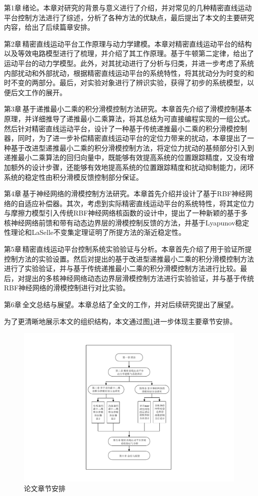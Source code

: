 第1章$\,$绪论。本章对研究的背景与意义进行了介绍，并对常见的几种精密直线运动平台控制方法进行了综述，分析了各种方法的优缺点，最后提出了本文的主要研究内容，给出了后续篇章安排。

第2章$\,$精密直线运动平台工作原理与动力学建模。本章对精密直线运动平台的结构以及等效电路模型进行了梳理，并介绍了其工作原理。基于牛顿第二定律，给出了运动平台的动力学模型。此外，对其扰动进行了分析与归类，并进一步考虑了系统内部扰动和外部扰动，根据精密直线运动平台的系统特性，将其扰动分为时变的和时不变的两部分。最后，对实验对象进行了辨识实验，获得了初步的系统模型，以便后文工作的展开。

第3章$\,$基于递推最小二乘的积分滑模控制方法研究。本章首先介绍了滑模控制基本原理，并详细推导了递推最小二乘算法，将其总结为可直接编程实现的一组公式。然后针对精密直线运动平台，设计了一种基于传统递推最小二乘的积分滑模控制器，同时，为了进一步补偿精密直线运动平台的定位力带来的扰动，本章提出了一种基于改进型递推最小二乘的积分滑模控制方法，将定位力扰动的基频部分引入到递推最小二乘算法的回归向量中，既能够有效提高系统的位置跟踪精度，又没有增加额外的设计步骤，还能够有效地提高系统的位置跟踪精度和扰动抑制能力，闭环系统的稳定性由积分滑模反馈控制部分保证。

第4章$\,$基于神经网络的滑模控制方法研究。本章首先介绍并设计了基于RBF神经网络的自适应补偿器。其次，考虑到实际精密直线运动平台的系统特性，将其定位力与摩擦力模型引入传统RBF神经网络核函数的设计中，提出了一种新颖的基于多核神经网络前馈和带有动态边界层的滑模控制反馈的方法，并基于Lyapunov稳定性理论和LaSelle不变集定理证明了所提方法的渐近稳定性。

第5章$\,$精密直线运动平台控制系统实验验证与分析。本章首先介绍了用于验证所提控制方法的实验设置。然后对提出的基于改进型递推最小二乘的积分滑模控制方法进行了实验验证，并与基于传统递推最小二乘的积分滑模控制方法进行比较。最后，对提出的多核神经网络动态边界层滑模控制方法进行实验验证，并与基于传统RBF神经网络的滑模控制进行对比实验。

第6章$\,$全文总结与展望。本章总结了全文的工作，并对后续研究提出了展望。

为了更清晰地展示本文的组织结构，本文通过图\ref{论文章节安排}进一步体现主要章节安排。

\begin{figure}[H]
	\centering
	\includegraphics[width=12cm]{figures/章节安排.pdf}
	\caption{论文章节安排}
	\label{论文章节安排}
\end{figure}
